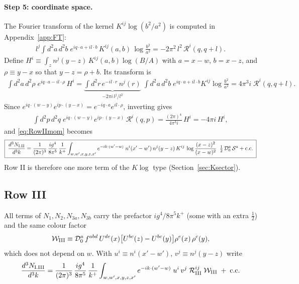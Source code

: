\documentclass[10pt]{article}
\numberwithin{equation}{section}
\begin{document}
\paragraph{Step 5: coordinate space.} The Fourier transform of the kernel $K^{ij}\log(b^{2}/a^{2})$ is computed in Appendix~\ref{app:FT}:
\begin{align}
l^{j}\int d^{2}a\,d^{2}b\;e^{iq\cdot a+il\cdot b}\,K^{ij}(a,b)\,\log\frac{b^{2}}{a^{2}}=-2\pi^{2}\,l^{2}\,\mathcal{R}^{i}(q,q+l). \label{eq:FTresult}
\end{align}
Define $H^{i}\equiv\int_{z}n^{j}(y-z)\,K^{ij}(a,b)\log(B/A)$ with $a=x-w$, $b=x-z$, and $\rho\equiv y-x$ so that $y-z=\rho+b$. Its transform is
\begin{align}
\int d^{2}a\,d^{2}\rho\;e^{iq\cdot a-il\cdot\rho}\,H^{i}
=\underbrace{\int d^{2}r\,e^{-il\cdot r}\,n^{j}(r)}_{-2\pi i\,l^{j}/l^{2}}\;\int d^{2}a\,d^{2}b\;e^{iq\cdot a+il\cdot b}K^{ij}\log\frac{b^{2}}{a^{2}}=4\pi^{3}i\;\mathcal{R}^{i}(q,q+l).
\end{align}
Since $e^{iq\cdot(w-y)}e^{ip\cdot(y-x)}=e^{-iq\cdot a}e^{il\cdot\rho}$, inverting gives
\begin{align}
\int d^{2}p\,d^{2}q\;e^{iq\cdot(w-y)}e^{ip\cdot(y-x)}\,\mathcal{R}^{i}(q,p)=\frac{(2\pi)^{4}}{4\pi^{3}i}\,H^{i}=-4\pi i\,H^{i},
\end{align}
and \eqref{eq:RowIImom} becomes
\begin{align}
\boxed{\;\frac{d^{3}N_{\rm I.II}}{d^{3}k}=\frac{1}{(2\pi)^{3}}\,\frac{ig^{4}}{8\pi^{5}}\,\frac{1}{k^{+}}\int_{w,w',x,y,z,x'}e^{-ik\cdot(w'-w)}\;n^{i}(x'-w')\,n^{j}(y-z)\,K^{ij}\,\log\frac{(x-z)^{2}}{(x-w)^{2}}\;\;\tfrac12\,\mathcal{D}_{0}^{a}\,\mathcal{S}^{a}+{\rm c.c.}\;} \label{eq:RowIIcoord}
\end{align}
Row II is therefore one more term of the $K\log$ type (Section~\ref{sec:Ksector}).

\subsection{Row III}\label{sec:RowIII}

All terms of $N_{1},N_{2},N_{3a},N_{3b}$ carry the prefactor $ig^{4}/8\pi^{5}k^{+}$ (some with an extra $\tfrac12$) and the same colour factor
\begin{align}
\mathcal{W}_{\rm III}\equiv\mathcal{D}_{0}^{a}\,f^{abd}\,U^{de}(x)\big[U^{bc}(z)-U^{bc}(y)\big]\rho^{e}(x)\,\rho^{c}(y),
\end{align}
which does not depend on $w$. With $u^{i}\equiv n^{i}(x'-w')$, $v^{j}\equiv n^{j}(y-z)$ write
\begin{align}
\frac{d^{3}N_{\rm I.III}}{d^{3}k}=\frac{1}{(2\pi)^{3}}\,\frac{i g^{4}}{8\pi^{5}}\,\frac{1}{k^{+}}\int_{w,w',x,y,z,x'}e^{-ik\cdot(w'-w)}\;u^{i}\,v^{j}\;\mathcal{R}_{\rm III}^{ij}\;\mathcal{W}_{\rm III}\;+\;{\rm c.c.} \label{eq:defR}
\end{align}
\end{document}
